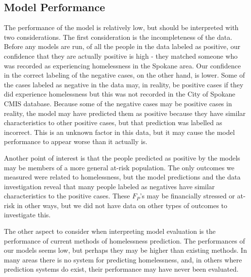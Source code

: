 \documentclass[utf8]{frontiersFPHY} %
\begin{document}
\subsection{Model Performance}
The performance of the model is relatively low, but should be interpreted with two considerations. The first consideration is the incompleteness of the data. Before any models are run, of all the people in the data labeled as positive, our confidence that they are actually positive is high - they matched someone who was recorded as experiencing homelessness in the Spokane area. Our confidence in the correct labeling of the negative cases, on the other hand, is lower. Some of the cases labeled as negative in the data may, in reality, be positive cases if they did experience homelessness but this was not recorded in the City of Spokane CMIS database. Because some of the negative cases may be positive cases in reality, the model may have predicted them as positive because they have similar characteristics to other positive cases, but that prediction was labelled as incorrect. This is an unknown factor in this data, but it may cause the model performance to appear worse than it actually is.

Another point of interest is that the people predicted as positive by the models may be members of a more general at-risk population. The only outcomes we measured were related to homelessness, but the model predictions and the data investigation reveal that many people labeled as negatives have similar characteristics to the positive cases. These $F_P$'s may be financially stressed or at-risk in other ways, but we did not have data on other types of outcomes to investigate this.

The other aspect to consider when interpreting model evaluation is the performance of current methods of homelessness prediction. The performances of our models seems low, but perhaps they may be higher than existing methods. In many areas there is no system for predicting homelessness, and, in others where prediction systems do exist, their performance may have never been evaluated.
\end{document}
